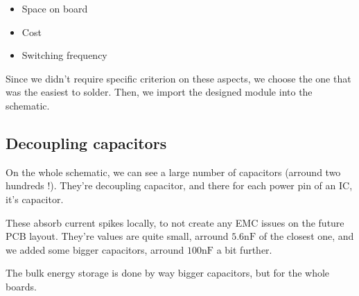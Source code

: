 \begin{itemize}[noitemsep]
    \item   Space on board
    \item   Cost
    \item   Switching frequency
\end{itemize}

Since we didn't require specific criterion on these aspects, we choose the one
that was the easiest to solder. Then, we import the designed module into the
schematic.

\subsection{Decoupling capacitors}
On the whole schematic, we can see a large number of capacitors (arround two
hundreds !). They're decoupling capacitor, and there for each power pin of an
IC, it's capacitor.

These absorb current spikes locally, to not create any EMC issues on the future
PCB layout. They're values are quite small, arround $5.6 \si{\nano\farad}$ of
the closest one, and we added some bigger capacitors, arround $100
    \si{\nano\farad}$ a bit further.

The bulk energy storage is done by way bigger capacitors, but for the whole
boards.
